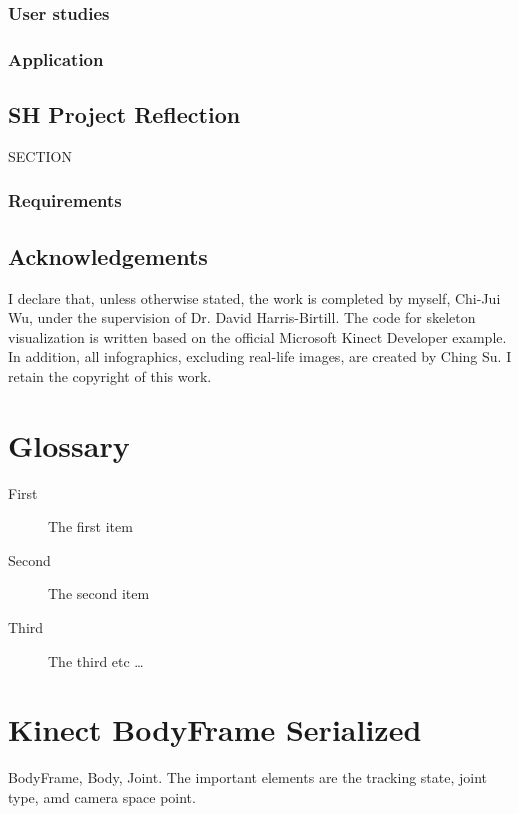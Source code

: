 \documentclass{sigchi}
\begin{document}
\subsection{User studies}

\subsection{Application}

\section{SH Project Reflection}

SECTION

\subsection{Requirements}

\section{Acknowledgements}
\label{sec:acknowledge}

I declare that, unless otherwise stated, the work is completed by myself, Chi-Jui Wu, under the supervision of Dr. David Harris-Birtill. The code for skeleton visualization is written based on the official Microsoft Kinect Developer example.
In addition, all infographics, excluding real-life images, are created by Ching Su. I retain the copyright of this work.

\balance{}




\begin{appendices}

\chapter{Glossary}

\begin{description}
  \item[First] The first item
  \item[Second] The second item
  \item[Third] The third etc \ldots
\end{description}

\chapter{Kinect BodyFrame Serialized}

BodyFrame, Body, Joint. The important elements are the tracking state, joint type, amd camera space point.

\cite{microsoft_kinect_namespace}

\end{appendices}
\end{document}
